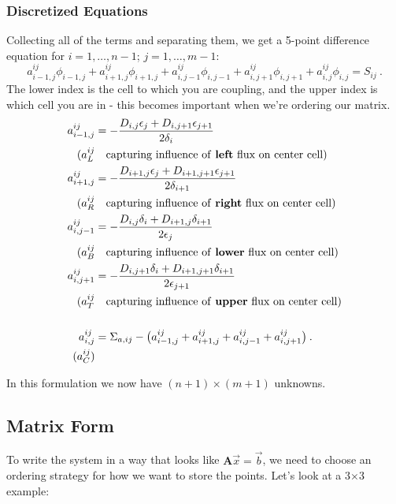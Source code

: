 \documentclass[12pt]{article}
\newcommand{\ve}[1]{\ensuremath{\mathbf{#1}}}
\begin{document}
\subsubsection*{Discretized Equations}
Collecting all of the terms and separating them, we get a 5-point difference equation for $i=1,\dots,n-1$; $j=1,\dots,m-1$:
%
\[a_{i-1,j}^{ij}\phi_{i-1,j} + a_{i+1,j}^{ij}\phi_{i+1,j} + a_{i,j-1}^{ij}\phi_{i,j-1} + a_{i,j+1}^{ij}\phi_{i,j+1} +  a_{i,j}^{ij}\phi_{i,j} = S_{ij} \:.\]
%
The lower index is the cell to which you are coupling, and the upper index is which cell you are in - this becomes important when we're ordering our matrix.
%
\begin{align}
a_{i-1,j}^{ij} &= -\frac{D_{i,j} \epsilon_{j} + D_{i,j+1} \epsilon_{j+1}}{2 \delta_{i}}  \nonumber \\
(a_L^{ij} & \quad \text{capturing influence of \textbf{left} flux on center cell}) \nonumber \\
%
a_{i+1,j}^{ij} &= -\frac{D_{i+1,j} \epsilon_{j} + D_{i+1,j+1} \epsilon_{j+1}}{2 \delta_{i+1}}  \nonumber \\
(a_R^{ij} & \quad \text{capturing influence of \textbf{right} flux on center cell}) \nonumber \\
%
a_{i,j-1}^{ij} &= -\frac{D_{i,j} \delta_{i} + D_{i+1,j} \delta_{i+1}}{2 \epsilon_{j}}  \nonumber \\
(a_B^{ij} & \quad \text{capturing influence of \textbf{lower} flux on center cell}) \nonumber \\
%
a_{i,j+1}^{ij} &= -\frac{D_{i,j+1} \delta_{i} + D_{i+1,j+1} \delta_{i+1}}{2 \epsilon_{j+1}}  \nonumber \\
(a_T^{ij} & \quad \text{capturing influence of \textbf{upper} flux on center cell}) \nonumber \\
%
\nonumber \\
a_{i,j}^{ij} &= \Sigma_{a,ij} - \bigl(a_{i-1,j}^{ij} + a_{i+1,j}^{ij} + a_{i,j-1}^{ij} + a_{i,j+1}^{ij} \bigr)
 \:.\nonumber \\
 (a_C^{ij}) & \nonumber
\end{align}

In this formulation we now have $(n+1) \times (m+1)$ unknowns. 

\subsection*{Matrix Form}
To write the system in a way that looks like $\ve{A}\vec{x} = \vec{b}$, we need to choose an ordering strategy for how we want to store the points. Let's look at a 3$\times$3 example:
\end{document}
